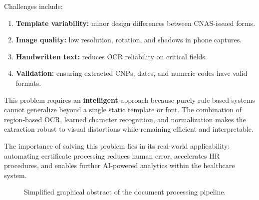 \documentclass[runningheads,a4paper,11pt]{report}
\begin{document}
\bigskip
\noindent
Challenges include:
\begin{enumerate}
  \item \textbf{Template variability:} minor design differences between CNAS-issued forms.
  \item \textbf{Image quality:} low resolution, rotation, and shadows in phone captures.
  \item \textbf{Handwritten text:} reduces OCR reliability on critical fields.
  \item \textbf{Validation:} ensuring extracted CNPs, dates, and numeric codes have valid formats.
\end{enumerate}

\bigskip
This problem requires an \textbf{intelligent} approach because purely rule-based systems cannot generalize beyond a single static template or font.  
The combination of region-based OCR, learned character recognition, and normalization makes the extraction robust to visual distortions while remaining efficient and interpretable.

\bigskip
The importance of solving this problem lies in its real-world applicability: automating certificate processing reduces human error, accelerates HR procedures, and enables further AI-powered analytics within the healthcare system.


\begin{figure}[htbp]
\centering
{}
\caption{Simplified graphical abstract of the document processing pipeline.}
\label{fig:pipeline}
\end{figure}
\end{document}
